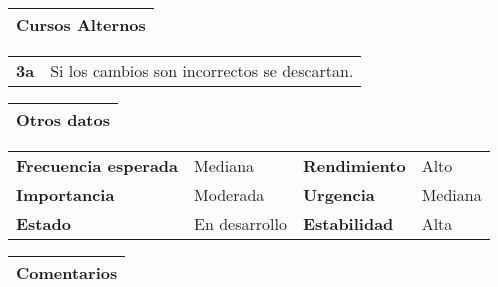 \documentclass[11pt,a4paper]{article}
\begin{document}
\begin{table}[H]
	\begin{tabularx}{\textwidth}{X}
		\textbf{Cursos Alternos}\\ \hline
	\end{tabularx}
	
	\begin{tabularx}{\textwidth}{cX}
		\textbf{3a} & Si los cambios son incorrectos se descartan.
	\end{tabularx}
	
\end{table}

\begin{table}[H]
	\begin{tabularx}{\textwidth}{X}
		\textbf{Otros datos}\\ \hline
	\end{tabularx}

	\begin{tabularx}{\textwidth}{lXlX}
		\textbf{Frecuencia esperada} & Mediana & \textbf{Rendimiento} & Alto\\
		\textbf{Importancia} & Moderada & \textbf{Urgencia} & Mediana \\
		\textbf{Estado} & En desarrollo & \textbf{Estabilidad} & Alta\\
	\end{tabularx}
	
	\begin{tabularx}{\textwidth}{X}
		\textbf{Comentarios}\\ \hline
	\end{tabularx}
\end{table}

\newpage


\end{document}
